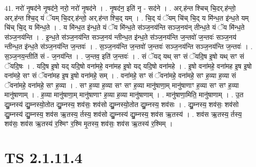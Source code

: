 \documentclass[17pt]{extarticle}
\begin{document}
41. नरो॑ नृ॒षद॑ने नृ॒षद॑ने॒ नरो॒ नरो॑ नृ॒षद॑ने । . नृ॒षद॑न॒ इति॑ नृ - सद॑ने । . अर्.ह॑न्त श्चिच् चि॒दर्.ह॑न्तो॒ अर्.ह॑न्त श्चि॒द् यं ॅयम् चि॒दर्.ह॑न्तो॒ अर्.ह॑न्त श्चि॒द् यम् । . चि॒द् यं ॅयम् चि॑च् चि॒द् य मि॑न्ध॒त इ॑न्ध॒ते यम् चि॑च् चि॒द् य मि॑न्ध॒ते । . य मि॑न्ध॒त इ॑न्ध॒ते यं ॅय मि॑न्ध॒ते स॑ञ्ज॒नय॑न्ति सञ्ज॒नय॑न् तीन्ध॒ते यं ॅय मि॑न्ध॒ते स॑ञ्ज॒नय॑न्ति । . इ॒न्ध॒ते स॑ञ्ज॒नय॑न्ति सञ्ज॒नय॑ न्तीन्ध॒त इ॑न्ध॒ते स॑ञ्ज॒नय॑न्ति ज॒न्तवो॑ ज॒न्तवः॑ सञ्ज॒नय॑ न्तीन्ध॒त इ॑न्ध॒ते स॑ञ्ज॒नय॑न्ति ज॒न्तवः॑ । . स॒ञ्ज॒नय॑न्ति ज॒न्तवो॑ ज॒न्तवः॑ सञ्ज॒नय॑न्ति सञ्ज॒नय॑न्ति ज॒न्तवः॑ । . स॒ञ्ज॒नय॒न्तीति॑ सं - ज॒नय॑न्ति । . ज॒न्तव॒ इति॑ ज॒न्तवः॑ । . सं ॅयद् यथ् सꣳ सं ॅयदि॒ष इ॒षो यथ् सꣳ सं ॅयदि॒षः । . यदि॒ष इ॒षो यद् यदि॒षो वना॑महे॒ वना॑मह इ॒षो यद् यदि॒षो वना॑महे । . इ॒षो वना॑महे॒ वना॑मह इ॒ष इ॒षो वना॑महे॒ सꣳ सं ॅवना॑मह इ॒ष इ॒षो वना॑महे॒ सम् । . वना॑महे॒ सꣳ सं ॅवना॑महे॒ वना॑महे॒ सꣳ ह॒व्या ह॒व्या सं ॅवना॑महे॒ वना॑महे॒ सꣳ ह॒व्या । . सꣳ ह॒व्या ह॒व्या सꣳ सꣳ ह॒व्या मानु॑षाणा॒म् मानु॑षाणाꣳ ह॒व्या सꣳ सꣳ ह॒व्या मानु॑षाणाम् । . ह॒व्या मानु॑षाणा॒म् मानु॑षाणाꣳ ह॒व्या ह॒व्या मानु॑षाणाम् । . मानु॑षाणा॒मिति॒ मानु॑षाणाम् । . उ॒त द्यु॒म्नस्य॑ द्यु॒म्नस्यो॒तोत द्यु॒म्नस्य॒ शव॑सः॒ शव॑सो द्यु॒म्नस्यो॒तोत द्यु॒म्नस्य॒ शव॑सः । . द्यु॒म्नस्य॒ शव॑सः॒ शव॑सो द्यु॒म्नस्य॑ द्यु॒म्नस्य॒ शव॑स ऋ॒तस्य॒ र्तस्य॒ शव॑सो द्यु॒म्नस्य॑ द्यु॒म्नस्य॒ शव॑स ऋ॒तस्य॑ । . शव॑स ऋ॒तस्य॒ र्तस्य॒ शव॑सः॒ शव॑स ऋ॒तस्य॑ र॒श्मिꣳ र॒श्मि मृ॒तस्य॒ शव॑सः॒ शव॑स ऋ॒तस्य॑ र॒श्मिम् । \newline
\pagebreak
{}

\section{ TS 2.1.11.4 }
\end{document}
